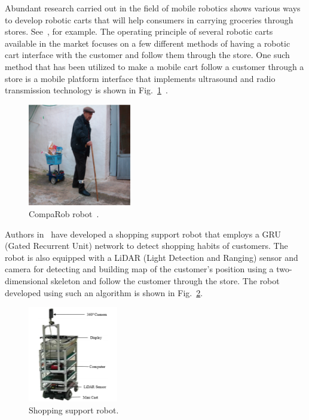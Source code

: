 \documentclass[conference]{IEEEtran}
\begin{document}
Abundant research carried out in the field of mobile robotics shows various ways to develop
robotic carts that will help consumers in carrying groceries through stores.
See~\cite{Rawashdeh2017-Person,islam_lam_fukuda_kobayashi_kuno_2019,Sales2016-CompaRob}, for example. The operating principle of several robotic carts available in the market focuses on a few different methods of having a
robotic cart interface with the customer and follow them through the store. One such method that has been utilized to make a mobile cart follow a customer through a store is a mobile platform interface that implements ultrasound and radio transmission technology is shown in Fig.~\ref{fig:CompaRob}~\cite{Sales2016-CompaRob}. %
%
\begin{figure}[htpb]
   \centering
   \includegraphics[width=0.4\textwidth]{figs/img/CompaRob}
   \caption{CompaRob robot~\cite{Sales2016-CompaRob}.}
   \label{fig:CompaRob}
 \end{figure}
% 
 Authors in~\cite{islam_lam_fukuda_kobayashi_kuno_2019} have developed a shopping
 support robot that employs a GRU (Gated Recurrent Unit) network to detect
 shopping habits of customers. The robot is also equipped with a LiDAR (Light
 Detection and Ranging) sensor and camera for detecting and building map of the
 customer's position using a two-dimensional skeleton and follow the customer
 through the store. The robot developed using such an algorithm is  shown in Fig.~\ref{fig:ShoppingSup}. %
%
\begin{figure}[htpb]
   \centering
   \includegraphics[width=0.35\textwidth]{figs/img/ShoppingSuportRobot}
   \caption{Shopping support robot.}
   \label{fig:ShoppingSup}
\end{figure}
\end{document}
